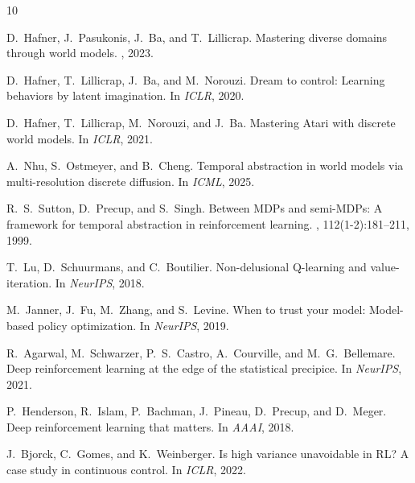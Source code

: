 \documentclass[10pt,twocolumn]{article}
\begin{document}
{\small

\begin{thebibliography}{10}

D.~Hafner, J.~Pasukonis, J.~Ba, and T.~Lillicrap.
\newblock Mastering diverse domains through world models.
, 2023.

D.~Hafner, T.~Lillicrap, J.~Ba, and M.~Norouzi.
\newblock Dream to control: Learning behaviors by latent imagination.
\newblock In {\em ICLR}, 2020.

D.~Hafner, T.~Lillicrap, M.~Norouzi, and J.~Ba.
\newblock Mastering Atari with discrete world models.
\newblock In {\em ICLR}, 2021.

A.~Nhu, S.~Ostmeyer, and B.~Cheng.
\newblock Temporal abstraction in world models via multi-resolution discrete diffusion.
\newblock In {\em ICML}, 2025.

R.~S.~Sutton, D.~Precup, and S.~Singh.
\newblock Between MDPs and semi-MDPs: A framework for temporal abstraction in reinforcement learning.
, 112(1-2):181--211, 1999.

T.~Lu, D.~Schuurmans, and C.~Boutilier.
\newblock Non-delusional Q-learning and value-iteration.
\newblock In {\em NeurIPS}, 2018.

M.~Janner, J.~Fu, M.~Zhang, and S.~Levine.
\newblock When to trust your model: Model-based policy optimization.
\newblock In {\em NeurIPS}, 2019.

R.~Agarwal, M.~Schwarzer, P.~S.~Castro, A.~Courville, and M.~G.~Bellemare.
\newblock Deep reinforcement learning at the edge of the statistical precipice.
\newblock In {\em NeurIPS}, 2021.

P.~Henderson, R.~Islam, P.~Bachman, J.~Pineau, D.~Precup, and D.~Meger.
\newblock Deep reinforcement learning that matters.
\newblock In {\em AAAI}, 2018.

J.~Bjorck, C.~Gomes, and K.~Weinberger.
\newblock Is high variance unavoidable in RL? A case study in continuous control.
\newblock In {\em ICLR}, 2022.

\end{thebibliography}
}
\end{document}
